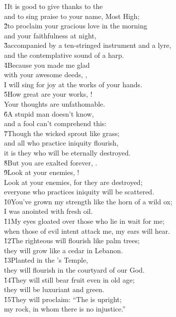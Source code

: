 \begin{poetry}
\poeml \v{1}It is good to give thanks to the  \\
\poemll    and to sing praise to your name, Most High; \\
\poeml \v{2}to proclaim your gracious love in the morning \\
\poemll    and your faithfulness at night, \\
\poeml \v{3}accompanied by a ten-stringed instrument and a lyre, \\
\poemll    and the contemplative sound of a harp. \\
\poeml \v{4}Because you made me glad \\
\poemll    with your awesome deeds, , \\
\poemlll       I will sing for joy at the works of your hands. \\
\poeml \v{5}How great are your works, ! \\
\poemll    Your thoughts are unfathomable. \\
\poeml \v{6}A stupid man doesn't know, \\
\poemll    and a fool can't comprehend this: \\
\poeml \v{7}Though the wicked sprout like grass; \\
\poemll    and all who practice iniquity flourish, \\
\poemlll       it is they who will be eternally destroyed. \\
\poeml \v{8}But you are exalted forever, . \\
\poeml \v{9}Look at your enemies, ! \\
\poemll    Look at your enemies, for they are destroyed; \\
\poemlll       everyone who practices iniquity will be scattered. \\
\poeml \v{10}You've grown my strength like the horn of a wild ox; \\
\poemll    I was anointed with fresh oil. \\
\poeml \v{11}My eyes gloated over those who lie in wait for me; \\
\poemll    when those of evil intent attack me, my ears will hear. \\
\poeml \v{12}The righteous will flourish like palm trees; \\
\poemll    they will grow like a cedar in Lebanon. \\
\poeml \v{13}Planted in the 's Temple, \\
\poemll    they will flourish in the courtyard of our God. \\
\poeml \v{14}They will still bear fruit even in old age; \\
\poemll    they will be luxuriant and green. \\
\poeml \v{15}They will proclaim: ``The  is upright; \\
\poemll    my rock, in whom there is no injustice.''
\end{poetry}
